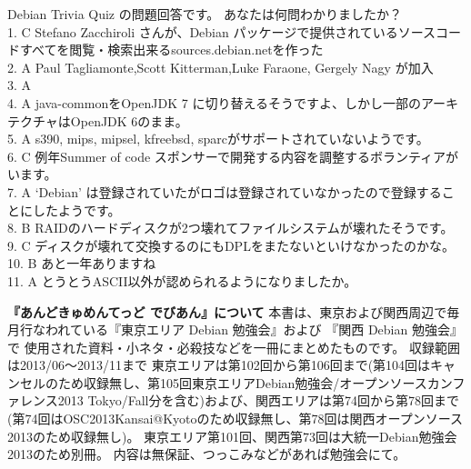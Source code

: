 \documentclass[mingoth,a4paper]{jsarticle}
\begin{document}
 Debian Trivia Quiz の問題回答です。
 あなたは何問わかりましたか？ \\
1. C Stefano Zacchiroli さんが、Debian パッケージで提供されているソースコードすべてを閲覧・検索出来るsources.debian.netを作った\\
2. A Paul Tagliamonte,Scott Kitterman,Luke Faraone, Gergely Nagy が加入\\
3. A \\
4. A java-commonをOpenJDK 7 に切り替えるそうですよ、しかし一部のアーキテクチャはOpenJDK 6のまま。\\
5. A s390, mips, mipsel, kfreebsd, sparcがサポートされていないようです。\\
6. C 例年Summer of code スポンサーで開発する内容を調整するボランティアがいます。\\
7. A `Debian' は登録されていたがロゴは登録されていなかったので登録することにしたようです。\\
8. B RAIDのハードディスクが2つ壊れてファイルシステムが壊れたそうです。\\
9. C ディスクが壊れて交換するのにもDPLをまたないといけなかったのかな。\\
10. B あと一年ありますね\\
11. A とうとうASCII以外が認められるようになりましたか。\\

\newpage
\thispagestyle{empty}\mbox{}

\newpage

\thispagestyle{empty}
{
\large
\begin{itembox}{\bf 『あんどきゅめんてっど でびあん』について}
本書は、東京および関西周辺で毎月行なわれている『東京エリア Debian 勉強会』および
『関西 Debian 勉強会』で
使用された資料・小ネタ・必殺技などを一冊にまとめたものです。
収録範囲は2013/06〜2013/11まで
東京エリアは第102回から第106回まで(第104回はキャンセルのため収録無し、第105回東京エリアDebian勉強会/オープンソースカンファレンス2013 Tokyo/Fall分を含む)および、関西エリアは第74回から第78回まで(第74回はOSC2013Kansai@Kyotoのため収録無し、第78回は関西オープンソース2013のため収録無し)。
東京エリア第101回、関西第73回は大統一Debian勉強会2013のため別冊。
内容は無保証、つっこみなどがあれば勉強会にて。
\end{itembox}
}
\end{document}
